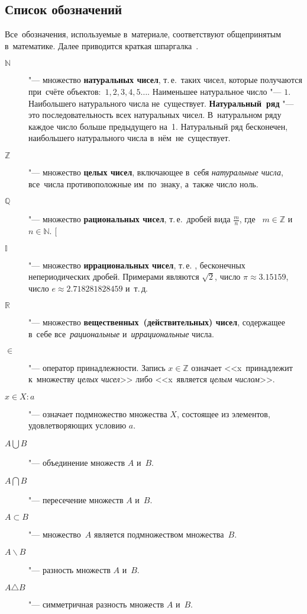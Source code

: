 \documentclass[]{scrartcl}
\begin{document}
\subsection{Список обозначений}\label{mathan-gloss-symbols}
Все~обозначения, используемые в~материале, соответствуют общепринятым в~математике. Далее приводится краткая шпаргалка~\cite{CSC:intro-in-matan}.
\begin{description}
	\item[$\mathbb{N}$] "--- множество \textbf{натуральных чисел}, т.\,е.~таких чисел, которые получаются при~счёте объектов:~$1, 2, 3, 4, 5\ldots$. Наименьшее натуральное число "--- $1$. Наибольшего натурального числа не~существует. \textbf{Натуральный~ряд} "--- это последовательность всех натуральных чисел. В~натуральном ряду каждое число больше предыдущего на~1. Натуральный ряд бесконечен, наибольшего натурального числа в~нём~не~существует.
	\item[$\mathbb{Z}$] "--- множество \textbf{целых чисел}, включающее в~себя \emph{натуральные числа}, все~числа противоположные им~по~знаку, а~также число ноль.
	\item[$\mathbb{Q}$] "--- множество \textbf{рациональных чисел}, т.\,е.~дробей вида $\frac{m}{n}$, где~ $m \in \mathbb{Z}$ и~$n \in \mathbb{N}$.
	[\item[$\mathbb{I}$] "--- множество \textbf{иррациональных чисел}, т.\,е. , бесконечных непериодических дробей. Примерами являются $\sqrt{2}$, число $\pi \approx 3.15159$, число $e \approx 2.718281828459$ и~т.\,д.
	\item[$\mathbb{R}$] "--- множество \textbf{вещественных~(действительных) чисел}, содержащее в~себе все~\emph{рациональные} и~\emph{иррациональные} числа.
	\item[$\in$] "--- оператор принадлежности. Запись $x \in \mathbb{Z}$ означает <<x~принадлежит к~множеству \emph{целых чисел}>> либо <<x~является \emph{целым числом}>>.
	\item[$x\in X:a$] "--- означает подмножество множества $X$, состоящее из элементов, удовлетворяющих условию $a$.
	\item[${A\bigcup B}$] "--- объединение множеств $A$ и~$B$.
	\item[${A\bigcap B}$] "--- пересечение множеств $A$ и~$B$.
	\item[${A\subset B}$] "--- множество~$A$ является подмножеством множества~$B$.
	\item[$A \backslash B$] "--- разность множеств $A$ и~$B$.
	\item[$A \triangle B$] "--- симметричная разность множеств $A$ и~$B$.

\end{description}
\end{document}
